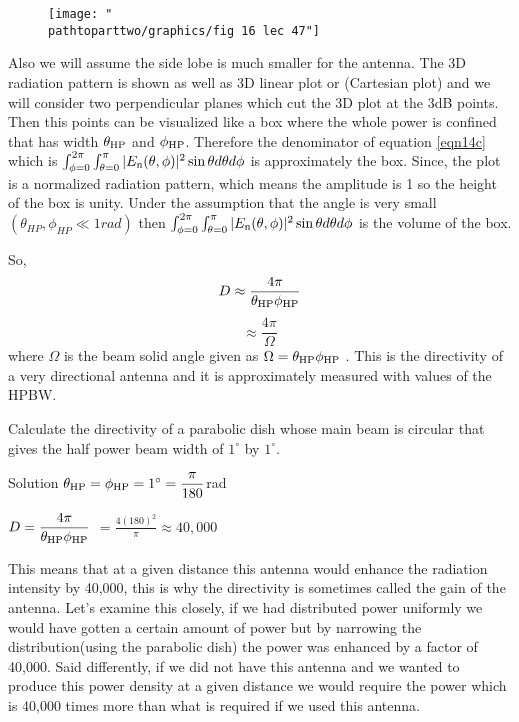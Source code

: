 \begin{enumerate}
\begin{figure}[h]
\centering
\texttt{[image: "\\pathtoparttwo/graphics/fig 16 lec 47"]}
\label{figure16}
\end{figure}

Also we will assume the side lobe is much smaller for the antenna. The 3D radiation pattern is shown as well as 3D linear plot or (Cartesian plot) and we will consider two perpendicular planes which cut the 3D plot at the 3dB points. Then this points can be visualized like a box where the whole power is confined that has width $\theta_{\textnormal{HP}}$ and $\phi_{\textnormal{HP}}$. Therefore the denominator of equation \ref{eqn14c} which is $\int_{\phi=0}^{2\pi} \int_{\theta=0}^{\pi}|E_{\textnormal{n}}(\theta, \phi)|^{2}\sin\theta d\theta d\phi$ is approximately the box.
Since, the plot is a normalized radiation pattern, which means the amplitude is 1 so the height of the box is unity. Under the assumption that the angle is very small $(\theta_{HP}, \phi_{HP} \ll 1rad)$ then $\int_{\phi=0}^{2\pi} \int_{\theta=0}^{\pi}|E_{\textnormal{n}}(\theta, \phi)|^{2}\sin\theta d\theta d\phi$ is the volume of the box.

So, 
$$D \approx \dfrac{4\pi}{\theta_{\textnormal{HP}}\phi_{\textnormal{HP}}}$$
$$\approx \frac{4\pi}{\Omega}$$
where $\Omega$ is the beam solid angle given as $\Omega =\theta_{\textnormal{HP}}\phi_{\textnormal{HP}} $ .
This is the directivity of a very directional antenna and it is approximately measured with values of the HPBW.	
\end{enumerate}	
\begin{exmp}
Calculate the directivity of a parabolic dish whose main beam is circular that gives the half power beam width of $1^\circ$ by $1^\circ$.
\begin{center}
Solution
$\theta_{\textnormal{HP}} =\phi_{\textnormal{HP}} =1^{\circ
}=\dfrac{\pi}{180}$rad


$D=\dfrac{4\pi}{\theta_{\textnormal{HP}}\phi_{\textnormal{HP}}}$
$= \frac{4(180)^2}{\pi} \approx 40,000$
\end{center}
\end{exmp}

This means that at a given distance this antenna would enhance the radiation intensity by 40,000, this is why the directivity is sometimes called the gain of the antenna. Let's examine this closely, if we had distributed power uniformly we would have gotten a certain amount of power but by narrowing the distribution(using the parabolic dish) the power was enhanced by a factor of 40,000. Said differently, if we did not have this antenna and we wanted to produce this power density at a given distance we would require the power which is 40,000 times more than what is required if we used this antenna.

